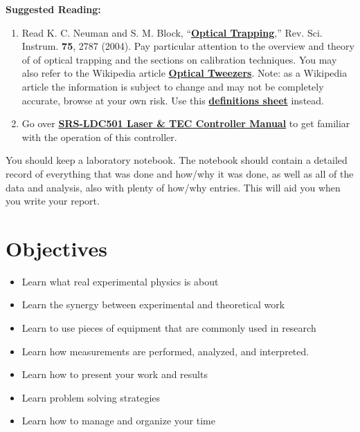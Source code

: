 \documentclass{../lab}
\begin{document}
\textbf{Suggested Reading:}

\begin{enumerate}
    \item Read K. C. Neuman and S. M. Block, ``\href{http://physics111.lib.berkeley.edu/Physics111/Reprints/OTZ/Neuman-optical_Trapping.pdf}{\textbf{Optical Trapping}},'' Rev. Sci. Instrum. \textbf{75}, 2787 (2004). Pay particular attention to the overview and theory of of optical trapping and the sections on calibration techniques. You may also refer to the Wikipedia article \href{http://en.wikipedia.org/wiki/Optical\_tweezers}{\textbf{Optical Tweezers}}. Note: as a Wikipedia article the information is subject to change and may not be completely accurate, browse at your own risk. Use this \href{http://physics111.lib.berkeley.edu/Physics111/Reprints/OTZ/biowikipedia.pdf}{\textbf{definitions sheet}} instead.

    \item Go over \href{http://experimentationlab.berkeley.edu/sites/default/files/images/LDC501m.pdf}{\textbf{SRS-LDC501 Laser \& TEC Controller Manual}} to get familiar with the operation of this controller.

\end{enumerate}

You should keep a laboratory notebook. The notebook should contain a detailed record of everything that was done and how/why it was done, as well as all of the data and analysis, also with plenty of how/why entries. This will aid you when you write your report.

\section{Objectives}

\begin{itemize}
    \item Learn what real experimental physics is about

    \item Learn the synergy between experimental and theoretical work

    \item Learn to use pieces of equipment that are commonly used in research

    \item Learn how measurements are performed, analyzed, and interpreted.

    \item Learn how to present your work and results

    \item Learn problem solving strategies

    \item Learn how to manage and organize your time
\end{itemize}
\end{document}
